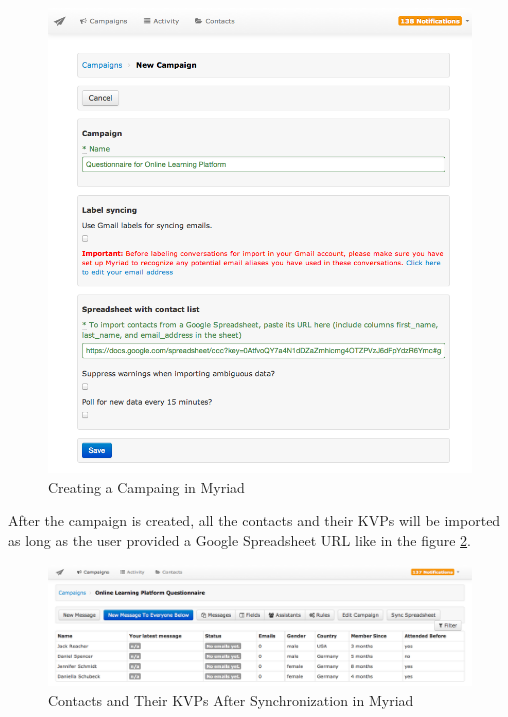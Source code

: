 \begin{figure}[htbp]
	\centering
	\includegraphics[width=1.00\textwidth]{imgs/CreateCampaign.png}
	\caption[Creating a Campaing in Myriad]{Creating a Campaing in Myriad}
	\label{fig:CreateCampaign}
\end{figure}

After the campaign is created, all the contacts and their \ac{KVP}s will be imported as long as the user provided a Google Spreadsheet \ac{URL} like in the figure \ref{fig:ContactListInCampaign}.

\begin{figure}[htbp]
	\centering
	\includegraphics[width=1.00\textwidth]{imgs/ContactListInCampaign.png}
	\caption[Contacts and Their \ac{KVP}s After Synchronization in Myriad]{Contacts and Their \ac{KVP}s After Synchronization in Myriad}
	\label{fig:ContactListInCampaign}
\end{figure}

